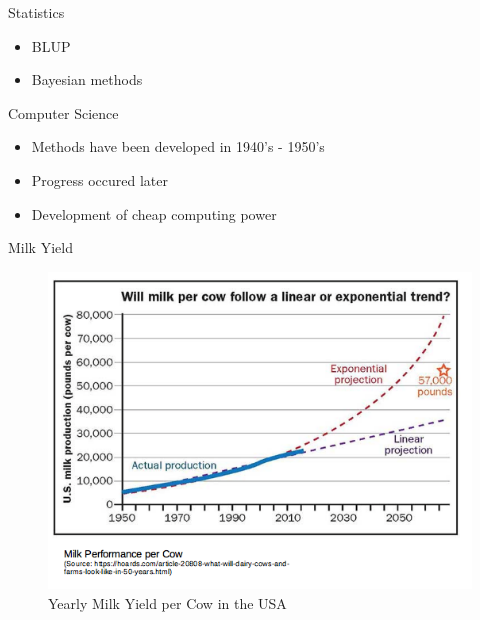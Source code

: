\documentclass[ignorenonframetext,]{beamer}
\providecommand{\tightlist}{%
  \setlength{\itemsep}{0pt}\setlength{\parskip}{0pt}}
\begin{document}
\begin{frame}{Statistics}
\protect\hypertarget{statistics}{}

\begin{itemize}
\tightlist
\item
  BLUP
\item
  Bayesian methods
\end{itemize}


\end{frame}

\begin{frame}{Computer Science}
\protect\hypertarget{computer-science}{}

\begin{itemize}
\tightlist
\item
  Methods have been developed in 1940's - 1950's
\item
  Progress occured later
\item
  Development of cheap computing power
\end{itemize}


\end{frame}

\begin{frame}{Milk Yield}
\protect\hypertarget{milk-yield}{}

\begin{figure}
\centering
\includegraphics{odg/milkcompperf.png}
\caption{Yearly Milk Yield per Cow in the USA}
\end{figure}


\end{frame}
\end{document}
